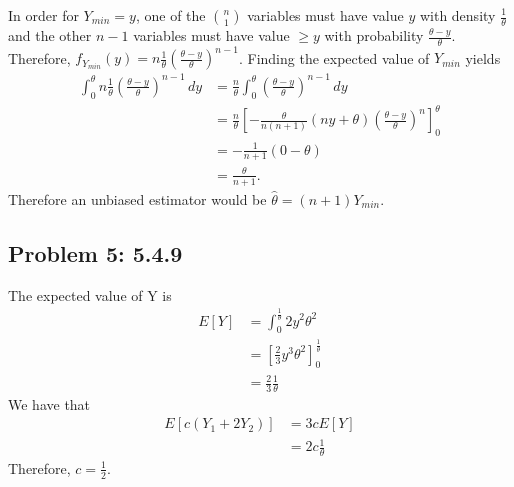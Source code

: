 \documentclass{article}
\begin{document}
In order for $Y_{min} = y$, one of the $\binom{n}{1}$ variables must have value 
$y$ with density $\frac{1}{\theta}$ and the other $n-1$ variables must have value
$\geq y$ with probability $\frac{\theta-y}{\theta}$.
Therefore, $f_{Y_{min}}(y) = n\frac{1}{\theta}\left(\frac{\theta-y}{\theta}\right)^{n-1}$.
Finding the expected value of $Y_{min}$ yields
\begin{align*}
	\int_0^\theta n\frac{1}{\theta}\left(\frac{\theta-y}{\theta}\right)^{n-1} \,dy
	&=\frac{n}{\theta} \int_0^\theta \left(\frac{\theta-y}{\theta}\right)^{n-1} \,dy \\
	&= \frac{n}{\theta} \left[-\frac{\theta}{n(n+1)}(ny+\theta)\left(\frac{\theta-y}{\theta}\right)^n\right]_0^\theta \\
	&= - \frac{1}{n+1}(0-\theta) \\
	&= \frac{\theta}{n+1}.
\end{align*}
Therefore an unbiased estimator would be $\hat{\theta} = (n+1)Y_{min}$.
\newpage 

\subsection*{Problem 5: 5.4.9}

The expected value of Y is 
\begin{align*}
	E[Y] &= \int_0^\frac{1}{\theta} 2y^2\theta^2 \\
	&= \left[\frac{2}{3}y^3\theta^2\right]_0^\frac{1}{\theta} \\
	&= \frac{2}{3}\frac{1}{\theta}
\end{align*}
We have that 
\begin{align*}
	E[c(Y_1+2Y_2)] &= 3cE[Y] \\
	&= 2c \frac{1}{\theta}
\end{align*}
Therefore, $c=\frac{1}{2}$.
\newpage 
\end{document}

